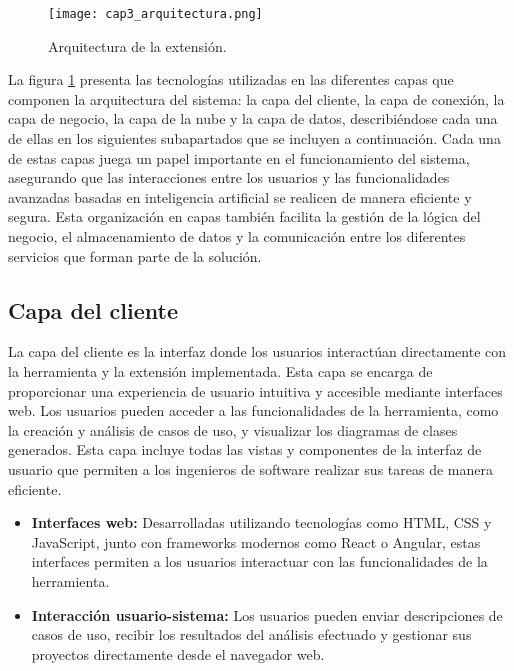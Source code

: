 \begin{figure}[H]  
	\centering
	\texttt{[image: cap3\_arquitectura.png]}
	\caption{Arquitectura de la extensión.}
	\label{fig:cap3_arquitectura}
\end{figure}

La figura \ref{fig:cap3_arquitectura} presenta las tecnologías utilizadas en las diferentes capas que componen la arquitectura del sistema: la capa del cliente, la capa de conexión, la capa de negocio, la capa de la nube y la capa de datos, describiéndose cada una de ellas en los siguientes subapartados que se incluyen a continuación. Cada una de estas capas juega un papel importante en el funcionamiento del sistema, asegurando que las interacciones entre los usuarios y las funcionalidades avanzadas basadas en inteligencia artificial se realicen de manera eficiente y segura. Esta organización en capas también facilita la gestión de la lógica del negocio, el almacenamiento de datos y la comunicación entre los diferentes servicios que forman parte de la solución.


\subsection{Capa del cliente}

La capa del cliente es la interfaz donde los usuarios interactúan directamente con la herramienta y la extensión implementada. Esta capa se encarga de proporcionar una experiencia de usuario intuitiva y accesible mediante interfaces web. Los usuarios pueden acceder a las funcionalidades de la herramienta, como la creación y análisis de casos de uso, y visualizar los diagramas de clases generados. Esta capa incluye todas las vistas y componentes de la interfaz de usuario que permiten a los ingenieros de software realizar sus tareas de manera eficiente.

\begin{itemize}
	\item \textbf{Interfaces web:} Desarrolladas utilizando tecnologías como HTML, CSS y JavaScript, junto con frameworks modernos como React o Angular, estas interfaces permiten a los usuarios interactuar con las funcionalidades de la herramienta.
	\item \textbf{Interacción usuario-sistema:} Los usuarios pueden enviar descripciones de casos de uso, recibir los resultados del análisis efectuado y gestionar sus proyectos directamente desde el navegador web.
\end{itemize}

